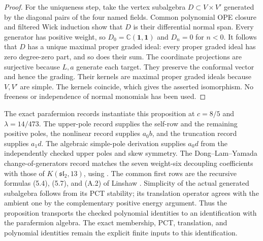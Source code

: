 \documentclass[11pt,a4paper]{article}
\theoremstyle{definition}
\begin{document}
\begin{proof}
For the uniqueness step, take the vertex subalgebra $D\subset V\times V'$
generated by the diagonal pairs of the four named fields. Common
polynomial OPE closure and filtered Wick induction show that $D$ is
their differential normal span. Every generator has positive weight,
so $D_0=\mathbb C(\mathbf1,\mathbf1)$ and $D_n=0$ for $n<0$.
It follows that $D$ has a unique maximal proper graded ideal: every
proper graded ideal has zero degree-zero part, and so does their sum.
The coordinate projections are surjective because $L,a$ generate
each target. They preserve the conformal vector and hence the grading.
Their kernels are maximal proper graded ideals because $V,V'$ are
simple. The kernels coincide, which gives the asserted isomorphism.
No freeness or independence of normal monomials has been used.
\end{proof}

The exact parafermion records instantiate this proposition at
$c=8/5$ and $\lambda=14/473$. The upper-pole record supplies the
self-row and the remaining positive poles, the nonlinear record
supplies $a_0b$, and the truncation record supplies $a_1d$.
The algebraic simple-pole derivation supplies $a_0d$ from the
independently checked upper poles and skew symmetry. The
Dong--Lam--Yamada change-of-generators record matches the seven
weight-six decoupling coefficients with those of
$K(\mathfrak{sl}_2,13)$, using \cite[Appendix B]{DLY}. The common first rows are the recursive
formulas (5.4), (5.7), and (A.2) of Linshaw \cite{Linshaw}. Simplicity of the actual
generated subalgebra follows from its PCT stability; its translation
operator agrees with the ambient one by the complementary positive
energy argument. Thus the proposition transports the checked
polynomial identities to an identification with the parafermion
algebra. The exact membership, PCT, translation, and polynomial
identities remain the explicit finite inputs to this identification.
\end{document}
